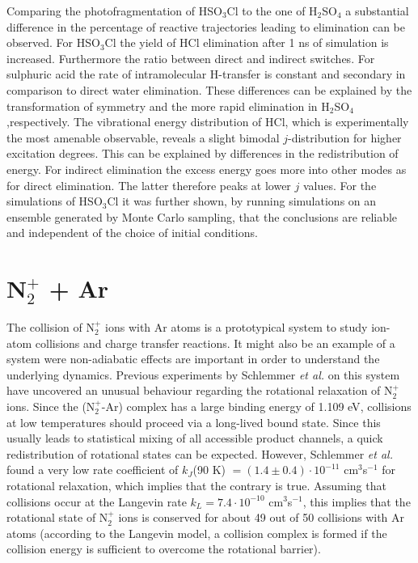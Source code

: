 \documentclass[journal=jacsat,manuscript=article]{achemso}
\begin{document}
\noindent
Comparing the photofragmentation of HSO$_3$Cl to the one of
H$_2$SO$_4$ a substantial difference in the percentage of reactive
trajectories leading to elimination can be observed. For HSO$_3$Cl the
yield of HCl elimination after 1 ns of simulation is
increased. Furthermore the ratio between direct and indirect
switches. For sulphuric acid the rate of intramolecular H-transfer is
constant and secondary in comparison to direct water
elimination. These differences can be explained by the transformation
of symmetry and the more rapid elimination in H$_2$SO$_4$
,respectively. The vibrational energy distribution of HCl, which is
experimentally the most amenable observable, reveals a slight bimodal
$j$-distribution for higher excitation degrees. This can be explained
by differences in the redistribution of energy. For indirect
elimination the excess energy goes more into other modes as for direct
elimination. The latter therefore peaks at lower $j$ values. For the
simulations of HSO$_3$Cl it was further shown, by running simulations
on an ensemble generated by Monte Carlo sampling, that the conclusions
are reliable and independent of the choice of initial conditions.
 

\section{N$_2^+$ + Ar}
\label{sec:n2plusar}
The collision of N$_2^+$ ions with Ar atoms is a prototypical system
to study ion-atom collisions and charge transfer reactions. It might
also be an example of a system were non-adiabatic effects are
important in order to understand the underlying dynamics. Previous
experiments by Schlemmer \textit{et
  al.}\cite{schlemmer.ijms.1999.n2plusargon} on this system have
uncovered an unusual behaviour regarding the rotational relaxation of
N$_2^+$ ions.  Since the (N$_2^+$-Ar) complex has a large binding
energy of 1.109 eV\cite{mahnert.jcp.1995.n2plusargon}, collisions at
low temperatures should proceed via a long-lived bound state. Since
this usually leads to statistical mixing of all accessible product
channels, a quick redistribution of rotational states can be
expected. However, Schlemmer \textit{et al.} found a very low rate
coefficient of $k_J$(90 K) $= (1.4\pm 0.4) \cdot 10^{-11}$
cm$^3$s$^{-1}$ for rotational relaxation, which implies that the
contrary is true. Assuming that collisions occur at the Langevin rate
$k_L = 7.4\cdot10^{-10}$ cm$^3$s$^{-1}$, this implies that the
rotational state of N$_2^+$ ions is conserved for about 49 out of 50
collisions with Ar atoms (according to the Langevin model, a collision
complex is formed if the collision energy is sufficient to overcome
the rotational barrier).\cite{schlemmer.ijms.1999.n2plusargon}\\
\end{document}

